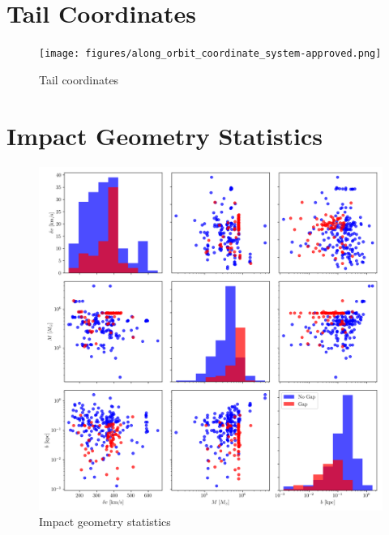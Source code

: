 \documentclass[draft]{aa}
\begin{document}



\begin{appendix}

  \section{Tail Coordinates} \label{appendix:TailCoordinates}

  \begin{figure}
    \centering
    \texttt{[image: figures/along\_orbit\_coordinate\_system-approved.png]}
    \caption{Tail coordinates}
    \label{fig:TailCoordinates}
  \end{figure}

  \section{Impact Geometry Statistics}

  \begin{figure}
    \centering
    \includegraphics[width=\linewidth]{impact_geometry_statistics.png}
    \caption{Impact geometry statistics}
    \label{fig:impact_geometry_statistics}    
    \end{figure}



\end{appendix}
\end{document}
